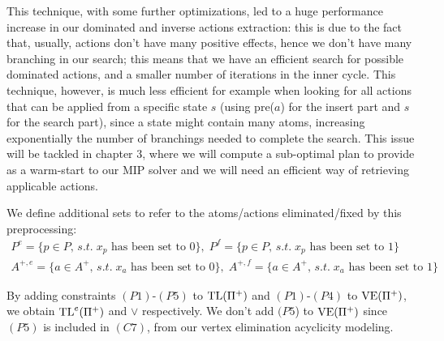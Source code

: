 This technique, with some further optimizations, led to a huge performance increase in our dominated and inverse actions extraction: this is due to the fact that, usually, actions don't have many positive effects, hence we don't have many branching in our search; this means that we have an efficient search for possible dominated actions, and a smaller number of iterations in the inner cycle. This technique, however, is much less efficient for example when looking for all actions that can be applied from a specific state $s$ (using pre($a$) for the insert part and $s$ for the search part), since a state might contain many atoms, increasing exponentially the number of branchings needed to complete the search. This issue will be tackled in chapter $3$, where we will compute a sub-optimal plan to provide as a warm-start to our MIP solver and we will need an efficient way of retrieving applicable actions.

We define additional sets to refer to the atoms/actions eliminated/fixed by this preprocessing: 
\begin{gather*}
    P^e=\{p\in P,\,s.t.\;x_p\mbox{ has been set to }0\},\;P^f=\{p\in P,\,s.t.\;x_p\mbox{ has been set to }1\}\\
    A^{+,e}=\{a\in A^+,\,s.t.\;x_a\mbox{ has been set to }0\},\;A^{+,f}=\{a\in A^+,\,s.t.\;x_a\mbox{ has been set to }1\}
\end{gather*}

By adding constraints $(P1)$-$(P5)$ to $\mbox{TL}(\Pi^+)$ and $(P1)$-$(P4)$ to $\mbox{VE}(\Pi^+)$, we obtain $\mbox{TL}^e(\Pi^+)$ and $\vee$ respectively. We don't add $(P5$) to $\mbox{VE}(\Pi^+)$ since $(P5)$ is included in $(C7)$, from our vertex elimination acyclicity modeling.